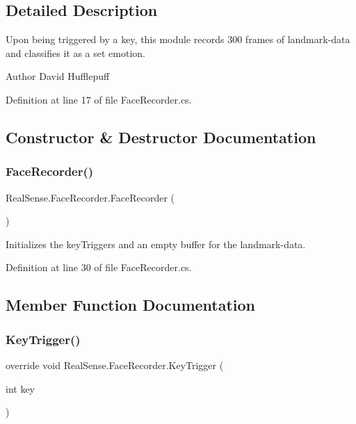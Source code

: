 \subsection{Detailed Description}
Upon being triggered by a key, this module records 300 frames of landmark-\/data and classifies it as a set emotion. \begin{DoxyAuthor}{Author}
David  Hufflepuff 
\end{DoxyAuthor}


Definition at line 17 of file Face\+Recorder.\+cs.



\subsection{Constructor \& Destructor Documentation}
\mbox{\label{class_real_sense_1_1_face_recorder_a782589b2a536a93d548f1efab49c6bcd}} 
\subsubsection{\texorpdfstring{Face\+Recorder()}{FaceRecorder()}}
{\footnotesize\ttfamily Real\+Sense.\+Face\+Recorder.\+Face\+Recorder (\begin{DoxyParamCaption}{ }\end{DoxyParamCaption})}

Initializes the key\+Triggers and an empty buffer for the landmark-\/data. 

Definition at line 30 of file Face\+Recorder.\+cs.



\subsection{Member Function Documentation}
\mbox{\label{class_real_sense_1_1_face_recorder_a315985241eb6c21f6393d8104a967eb6}} 
\subsubsection{\texorpdfstring{Key\+Trigger()}{KeyTrigger()}}
{\footnotesize\ttfamily override void Real\+Sense.\+Face\+Recorder.\+Key\+Trigger (\begin{DoxyParamCaption}\item[{int}]{key }\end{DoxyParamCaption})\hspace{0.3cm}{\ttfamily [virtual]}}

